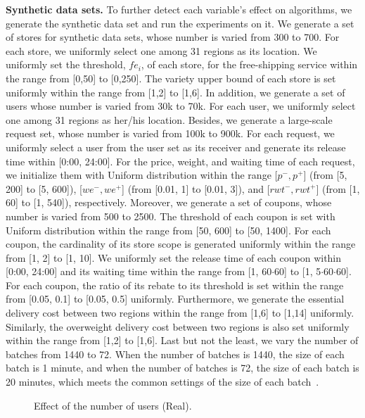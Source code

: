 \textbf{Synthetic data sets.} To further detect each variable's effect on algorithms, we generate the synthetic data set and run the experiments on it. 
We generate a set of stores for synthetic data sets, whose number is varied from 300 to 700. For each store, we uniformly select one among 31 regions as its location.  We uniformly set the threshold, $fe_i$, of each store, for the free-shipping service within the range from [0,50] to [0,250]. The variety upper bound of each store is set uniformly within the range from [1,2] to [1,6]. 
In addition, we generate a set of users whose number is varied from 30k to 70k. For each user, we uniformly select one among 31 regions as her/his location.
Besides, we generate a large-scale request set, whose number is varied from 100k to 900k. For each request, we uniformly select a user from the user set as its receiver and generate its release time within [0:00, 24:00]. For the price, weight, and waiting time of each request, we initialize them with Uniform distribution within the range [$p^-, p^+$] (from [5, 200] to [5, 600]), [$we^-, we^+$] (from [0.01, 1] to [0.01, 3]), and [$rwt^-, rwt^+]$ (from [1, 60] to [1, 540]), respectively.
Moreover, we generate a set of coupons, whose number is varied from 500 to 2500. The threshold of each coupon is set with Uniform distribution within the range from [50, 600] to [50, 1400]. For each coupon, the cardinality of its store scope is generated uniformly within the range from [1, 2] to [1, 10]. We uniformly set the release time of each coupon within [0:00, 24:00] and its waiting time within the range from [1, 60$\cdot$60] to [1, 5$\cdot$60$\cdot$60]. For each coupon, the ratio of its rebate to its threshold is set within the range from [0.05, 0.1] to [0.05, 0.5] uniformly. 
Furthermore, we generate the essential delivery cost between two regions within the range from [1,6] to [1,14] uniformly. Similarly, the overweight delivery cost between two regions is also set uniformly within the range from [1,2] to [1,6]. Last but not the least, we vary the number of batches from 1440 to 72. When the number of batches is 1440, the size of each batch is 1 minute, and when the number of batches is 72, the size of each batch is 20 minutes, which meets the common settings of the size of each batch~\cite{chen2020fair}.


\begin{figure}[t!]\centering\vspace{-2ex}
	\subfigcapskip=-5pt
	\vspace{-2ex}
	\addtocounter{subfigure}{-1}%
	\figureCaptionMargin
	\vspace{1ex}
	\caption{\small Effect of the number of users (Real).}%
	\label{fig:real_u}
\end{figure}

